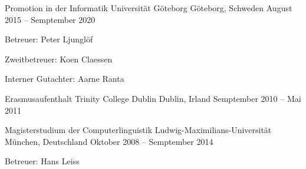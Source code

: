 \documentclass[11pt, a4]{academic-cv}
\begin{document}
\begin{cventries}
\cventry
{Promotion in der Informatik} %
{ Universität Göteborg} %
{Göteborg, Schweden} %
{August 2015 -- Semptember 2020} %
{
\begin{cvitems} %
\item Betreuer: Peter Ljunglöf
\item Zweitbetreuer: Koen Claessen
\item Interner Gutachter: Aarne Ranta
\end{cvitems}
}

\cventry
{Erasmusaufenthalt} %
{ Trinity College Dublin} %
{Dublin, Irland} %
{Semptember 2010 -- Mai 2011} %
{
}

\cventry
{Magisterstudium der Computerlinguistik} %
{ Ludwig-Maximilians-Universität} %
{München, Deutschland} %
{Oktober 2008 -- Semptember 2014} %
{
\begin{cvitems} %
\item Betreuer: Hans Leiss
\end{cvitems}
}

\end{cventries}
\vspace{-10px}
\end{document}
